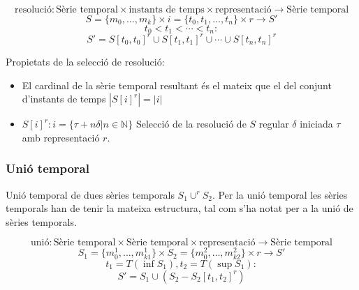 \begin{definition}
  \[
  \text{resolució}: \text{Sèrie temporal} \times \text{instants de
    temps} \times \text{representació} \longrightarrow \text{Sèrie
    temporal}
  \]
  \[
  S = \{m_0 , \ldots , m_k\} \times i = \{t_0,t_1,\dotsc,t_n\} \times r
  \longrightarrow S'
  \]
  \[
  t_0 < t_1 < \dotsb < t_n:
  \]
  \[
  S' = S[t_0,t_0]^r \cup  S[t_1,t_1]^r \cup \dotsb \cup S[t_{n},t_n]^r
  \] 
\end{definition}



Propietats de la selecció de resolució:
\begin{itemize}

\item El cardinal de la sèrie temporal resultant és el mateix que el del conjunt d'instants de temps $|S[i]^r| = |i|$

\item  $S[i]^r: i = \{\tau+n\delta | n\in\mathbb{N}\}$ Selecció de la resolució de $S$ regular $\delta$ iniciada $\tau$  amb representació $r$.
\end{itemize}







\subsubsection{Unió temporal}

Unió temporal de dues sèries temporals $S_1 \cup^r S_2$. Per la unió temporal les sèries temporals han de tenir la mateixa estructura, tal com s'ha notat per a la unió de sèries temporals.

\begin{definition}
  \[
  \text{unió}: \text{Sèrie temporal} \times \text{Sèrie temporal}
  \times \text{representació} \longrightarrow \text{Sèrie temporal}
  \]
  \[
  S_1 = \{m_0^1 , \ldots , m_{k1}^1\}  \times S_2 = \{m_0^2 , \ldots , m_{k2}^2\} \times r \longrightarrow S'
  \]
  \[
  t_1=T(\inf S_1), t_2=T(\sup S_1):
  \]
  \[
  S' = S_1 \cup  ( S_2 - S_2[t_1,t_2]^r )
  \] 
\end{definition}



